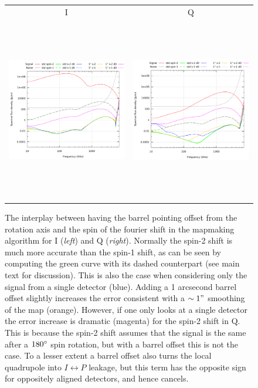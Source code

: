 \documentclass{article}
\begin{document}
\begin{figure}
	\centering
	\hspace*{-5mm}\begin{tabular}{cc}
		I & Q \\
		\includegraphics[height=80mm,clip,trim=0 0 6mm 0]{plots/spin_offset_T_abs_log_log.pdf} &
		\includegraphics[height=80mm,clip,trim=27mm 0 0 0]{plots/spin_offset_Q_abs_log_log.pdf}
	\end{tabular}
	\caption{The interplay between having the barrel pointing offset
	from the rotation axis and the spin of the fourier shift in the
	mapmaking algorithm for I (\emph{left}) and Q (\emph{right}).
	Normally the spin-2 shift is much more accurate than the spin-1
	shift, as can be seen by computing the green curve with its
	dashed counterpart (see main text for discussion). This
	is also the case when considering only the signal from a single
	detector (blue). Adding a 1 arcsecond barrel offset slightly
	increases the error consistent with a $\sim 1"$ smoothing
	of the map (orange). However, if one only looks at a single
	detector the error increase is dramatic (magenta) for
	the spin-2 shift in Q. This is because the spin-2 shift assumes
	that the signal is the same after a $180\degree$ spin rotation,
	but with a barrel offset this is not the case. To a lesser extent
	a barrel offset also turns the local quadrupole into $I\leftrightarrow P$
	leakage, but this term has the opposite sign for oppositely aligned
	detectors, and hence cancels.}
\end{figure}
\end{document}
